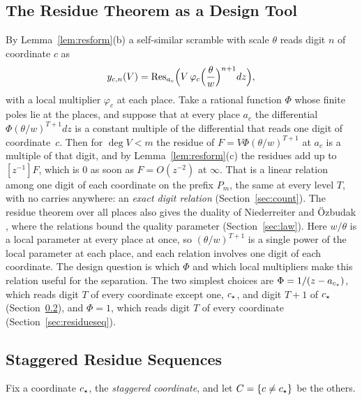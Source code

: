 \subsection{The Residue Theorem as a Design Tool}\label{sec:restool}
By Lemma~\ref{lem:resform}(b) a self-similar scramble with scale $\theta$ reads digit $n$ of coordinate $c$ as
\[
y_{c,n}(V)=\operatorname{Res}_{a_c}\Bigl(V\,\varphi_c\Bigl(\frac\theta w\Bigr)^{n+1}dz\Bigr),
\]
with a local multiplier $\varphi_c$ at each place. Take a rational function $\Phi$ whose finite poles lie at the places, and suppose that at every place $a_c$ the differential $\Phi(\theta/w)^{T+1}dz$ is a constant multiple of the differential that reads one digit of coordinate~$c$. Then for $\deg V<m$ the residue of $F=V\Phi(\theta/w)^{T+1}$ at $a_c$ is a multiple of that digit, and by Lemma~\ref{lem:resform}(c) the residues add up to $[z^{-1}]F$, which is $0$ as soon as $F=O(z^{-2})$ at $\infty$. That is a linear relation among one digit of each coordinate on the prefix $P_m$, the same at every level $T$, with no carries anywhere: an \emph{exact digit relation} (Section~\ref{sec:count}). The residue theorem over all places also gives the duality of Niederreiter and \"Ozbudak \cite{NO07}, where the relations bound the quality parameter (Section~\ref{sec:law}). Here $w/\theta$ is a local parameter at every place at once, so $(\theta/w)^{T+1}$ is a single power of the local parameter at each place, and each relation involves one digit of each coordinate. The design question is which $\Phi$ and which local multipliers make this relation useful for the separation. The two simplest choices are $\Phi=1/(z-a_{c_{\star}})$, which reads digit $T$ of every coordinate except one, $c_{\star}$, and digit $T+1$ of $c_{\star}$ (Section~\ref{sec:brickwall}), and $\Phi=1$, which reads digit $T$ of every coordinate (Section~\ref{sec:residueseq}).

\subsection{Staggered Residue Sequences}\label{sec:brickwall}
Fix a coordinate $c_{\star}$, the \emph{staggered coordinate}, and let $C=\{c\ne c_{\star}\}$ be the others.

